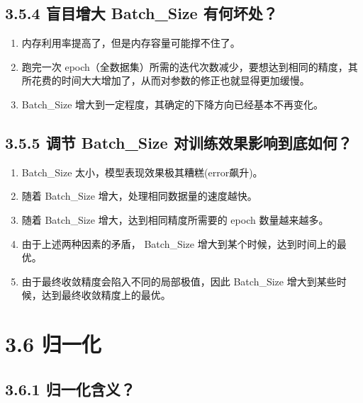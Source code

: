 \subsection{3.5.4 盲目增大 Batch\_Size
有何坏处？}\label{ux76f2ux76eeux589eux5927-batch_size-ux6709ux4f55ux574fux5904}

\begin{enumerate}
\def\labelenumi{\arabic{enumi}.}
 
\item
  内存利用率提高了，但是内存容量可能撑不住了。
\item
  跑完一次
  epoch（全数据集）所需的迭代次数减少，要想达到相同的精度，其所花费的时间大大增加了，从而对参数的修正也就显得更加缓慢。
\item
  Batch\_Size 增大到一定程度，其确定的下降方向已经基本不再变化。
\end{enumerate}

\subsection{3.5.5 调节 Batch\_Size
对训练效果影响到底如何？}\label{ux8c03ux8282-batch_size-ux5bf9ux8badux7ec3ux6548ux679cux5f71ux54cdux5230ux5e95ux5982ux4f55}

\begin{enumerate}
\def\labelenumi{\arabic{enumi}.}
 
\item
  Batch\_Size 太小，模型表现效果极其糟糕(error飙升)。
\item
  随着 Batch\_Size 增大，处理相同数据量的速度越快。
\item
  随着 Batch\_Size 增大，达到相同精度所需要的 epoch 数量越来越多。
\item
  由于上述两种因素的矛盾， Batch\_Size
  增大到某个时候，达到时间上的最优。
\item
  由于最终收敛精度会陷入不同的局部极值，因此 Batch\_Size
  增大到某些时候，达到最终收敛精度上的最优。
\end{enumerate}

\section{3.6 归一化}\label{ux5f52ux4e00ux5316}

\subsection{3.6.1 归一化含义？}\label{ux5f52ux4e00ux5316ux542bux4e49}

